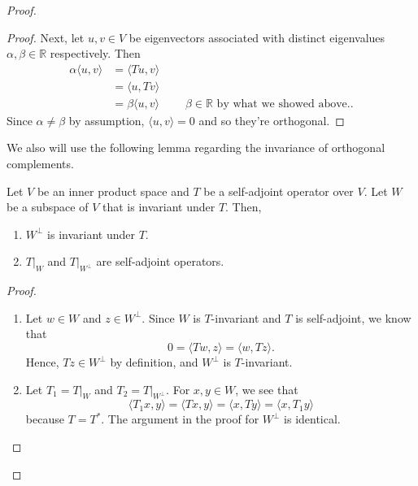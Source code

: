 \documentclass{article}
\begin{document}
\begin{proof}
\begin{description}
\begin{proof}
				Next, let \(u, v\in V\) be eigenvectors associated with distinct
				eigenvalues \(\alpha, \beta\in \mathbb{R}\) respectively.  Then
				\begin{align*}
					\alpha \langle u, v \rangle & = \langle T u, v \rangle                                                                   \\
					                            & = \langle u, T v \rangle                                                                   \\
					                            & = \beta \langle u, v \rangle &  & \text{ \(\beta\in \mathbb{R}\) by what we showed above.}
					.\end{align*}
				Since \(\alpha \neq \beta\) by assumption, \(\langle u, v\rangle = 0\)
				and so they're orthogonal.
			\end{proof}

			We also will use the following lemma regarding the invariance of
			orthogonal complements.

			\begin{lemma}\label{lem:ortho_invariant}
				Let \(V\) be an inner product space and \(T\) be a self-adjoint
				operator over \(V\).  Let \(W\) be a subspace of \(V\) that is
				invariant under \(T\).  Then,
				\begin{enumerate}
					\item \(W^{\perp}\) is invariant under \(T\).
					\item \(T|_{W}\) and \(T|_{W^{\perp}}\) are self-adjoint operators.
				\end{enumerate}
			\end{lemma}
			\begin{proof}\leavevmode
				\begin{enumerate}
					\item Let \(w\in W\) and \(z\in W^{\perp}\).  Since \(W\) is
					      \(T\)-invariant and \(T\) is self-adjoint, we know that
					      \[
						      0 = \langle Tw, z \rangle = \langle w, Tz \rangle
						      .\]
					      Hence, \(Tz\in W^{\perp}\) by definition, and \(W^{\perp}\) is
					      \(T\)-invariant.
					\item Let \(T_1 = T|_W\) and \(T_2 = T|_{W^{\perp}}\).  For \(x, y\in W\), we
					      see that
					      \[
						      \langle T_1x, y \rangle = \langle Tx, y \rangle = \langle x, Ty
						      \rangle = \langle x, T_1y \rangle
					      \]
					      because \(T = T^*\).  The argument in the proof for \(W^{\perp}\) is
					      identical.\qedhere
				\end{enumerate}
			\end{proof}


\end{description}
\end{proof}
\end{document}
